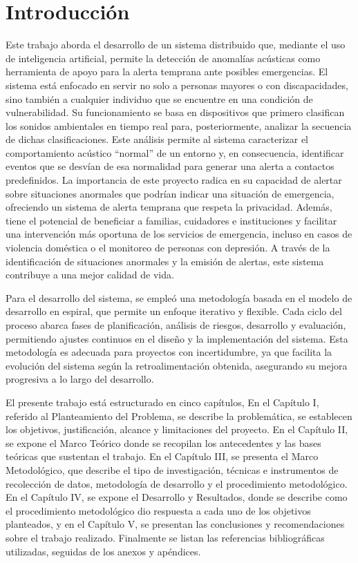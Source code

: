 \chapter*{Introducción}

Este trabajo aborda el desarrollo de un sistema distribuido que, mediante el uso de inteligencia artificial, permite la detección de anomalías acústicas como herramienta de apoyo para la alerta temprana ante posibles emergencias. El sistema está enfocado en servir no solo a personas mayores o con discapacidades, sino también a cualquier individuo que se encuentre en una condición de vulnerabilidad. Su funcionamiento se basa en dispositivos que primero clasifican los sonidos ambientales en tiempo real para, posteriormente, analizar la secuencia de dichas clasificaciones. Este análisis permite al sistema caracterizar el comportamiento acústico “normal” de un entorno y, en consecuencia, identificar eventos que se desvían de esa normalidad para generar una alerta a contactos predefinidos. La importancia de este proyecto radica en su capacidad de alertar sobre situaciones anormales que podrían indicar una situación de emergencia, ofreciendo un sistema de alerta temprana que respeta la privacidad. Además, tiene el potencial de beneficiar a familias, cuidadores e instituciones y facilitar una intervención más oportuna de los servicios de emergencia, incluso en casos de violencia doméstica o el monitoreo de personas con depresión. A través de la identificación de situaciones anormales y la emisión de alertas, este sistema contribuye a una mejor calidad de vida.

Para el desarrollo del sistema, se empleó una metodología basada en el modelo de desarrollo en espiral, que permite un enfoque iterativo y flexible. Cada ciclo del proceso abarca fases de planificación, análisis de riesgos, desarrollo y evaluación, permitiendo ajustes continuos en el diseño y la implementación del sistema. Esta metodología es adecuada para proyectos con incertidumbre, ya que facilita la evolución del sistema según la retroalimentación obtenida, asegurando su mejora progresiva a lo largo del desarrollo.

El presente trabajo está estructurado en cinco capítulos, En el Capítulo I, referido al Planteamiento del Problema, se describe la problemática, se establecen los objetivos, justificación, alcance y limitaciones del proyecto. En el Capítulo II, se expone el Marco Teórico donde se recopilan los antecedentes y las bases teóricas que sustentan el trabajo. En el Capítulo III, se presenta el Marco Metodológico, que describe el tipo de investigación, técnicas e instrumentos de recolección de datos, metodología de desarrollo y el procedimiento metodológico. En el Capítulo IV, se expone el Desarrollo y Resultados, donde se describe como el procedimiento metodológico dio respuesta a cada uno de los objetivos planteados, y en el Capítulo V, se presentan las conclusiones y recomendaciones sobre el trabajo realizado. Finalmente se listan las referencias bibliográficas utilizadas, seguidas de los anexos y apéndices.

\clearpage
